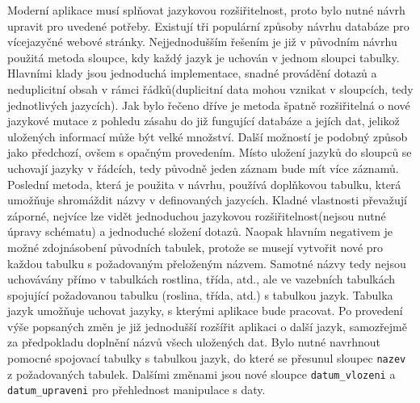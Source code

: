 \documentclass[12pt]{article}%
\begin{document}
{{Moderní aplikace musí splňovat jazykovou rozšiřitelnost, proto 
bylo nutné návrh upravit pro uvedené potřeby. Existují tři populární způsoby návrhu databáze 
pro vícejazyčné webové stránky. Nejjednodušším řešením je již v původním návrhu použitá metoda sloupce, 
kdy každý jazyk je uchován v jednom sloupci tabulky. Hlavními klady jsou jednoduchá implementace, 
snadné provádění dotazů a neduplicitní obsah v rámci řádků(duplicitní data mohou vznikat 
v sloupcích, tedy jednotlivých jazycích). Jak bylo řečeno dříve je metoda špatně rozšiřitelná 
o nové jazykové mutace z pohledu zásahu do již fungující databáze a jejích dat, jelikož uložených
informací může být velké množství. Další možností je podobný způsob jako předchozí, ovšem s opačným 
provedením. Místo uložení jazyků do sloupců se uchovají jazyky v řádcích, tedy původně jeden záznam 
bude mít více záznamů. Poslední metoda, která je použita v návrhu, používá doplňkovou tabulku, která 
umožňuje shromáždit názvy v definovaných jazycích. Kladné vlastnosti převažují záporné, nejvíce lze
vidět jednoduchou jazykovou rozšiřitelnost(nejsou nutné úpravy schématu) a jednoduché složení dotazů.
Naopak hlavním negativem je možné zdojnásobení původních tabulek, protože se musejí vytvořit nové 
pro každou tabulku s požadovaným přeloženým názvem. Samotné názvy tedy nejsou uchovávány přímo 
v tabulkách rostlina, třída, atd., ale ve vazebních tabulkách spojující požadovanou tabulku
(roslina, třída, atd.) s tabulkou jazyk. Tabulka jazyk umožňuje uchovat jazyky, s kterými aplikace 
bude pracovat. Po provedení výše popsaných změn je již jednodušší rozšířit aplikaci o další jazyk, 
samozřejmě za předpokladu doplnění názvů všech uložených dat. Bylo nutné navrhnout pomocné spojovací 
tabulky s tabulkou jazyk, do které se přesunul sloupec \texttt{nazev} z požadovaných tabulek. 
Dalšími změnami jsou nové sloupce \texttt{datum\_vlozeni} a \texttt{datum\_upraveni} pro přehlednost 
manipulace s daty.

\obrazek
{}
\newpage

}}
\end{document}
